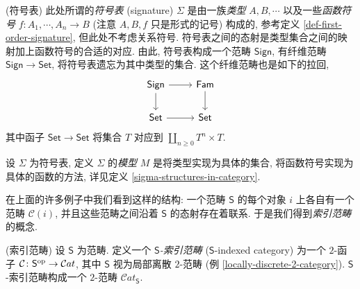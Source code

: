 \begin{example}
	{(符号表)}
	此处所谓的\emph{符号表} (signature) $\Sigma$ 是由一族\emph{类型} $A,B,\cdots$ 以及一些\emph{函数符号} $f\colon A_1,\cdots,A_n\to B$ (注意 $A,B,f$ 只是形式的记号) 构成的, 参考定义 \ref{def-first-order-signature}, 但此处不考虑关系符号. 符号表之间的态射是类型集合之间的映射加上函数符号的合适的对应. 由此, 符号表构成一个范畴 $\mathsf {Sign}$, 有纤维范畴 $\mathsf {Sign}\to\mathsf {Set}$, 将符号表遗忘为其中类型的集合.
	这个纤维范畴也是如下的拉回,
	\[\begin{tikzcd}[ampersand replacement=\&]
		{\mathsf {Sign}} \& {\mathsf {Fam}} \\
		{\mathsf {Set}} \& {\mathsf {Set}}
		\arrow[from=1-1, to=2-1]
		\arrow[from=2-1, to=2-2]
		\arrow[from=1-1, to=1-2]
		\arrow[from=1-2, to=2-2]
	\end{tikzcd}\]
	其中函子 $\mathsf {Set}\to\mathsf {Set}$ 将集合 $T$ 对应到 $\coprod_{n\geq 0}T^n\times T$.
	
	设 $\Sigma$ 为符号表, 定义 $\Sigma$ 的\emph{模型} $M$ 是将类型实现为具体的集合, 将函数符号实现为具体的函数的方法, 详见定义 \ref{sigma-structures-in-category}.
\end{example}

在上面的许多例子中我们看到这样的结构: 一个范畴 $\mathsf S$ 的每个对象 $i$ 上各自有一个范畴 $\mathcal C(i)$, 并且这些范畴之间沿着 $\mathsf S$ 的态射存在着联系. 于是我们得到\emph{索引范畴}的概念.

\begin{definition}
	{(索引范畴)}
	设 $\mathsf S$ 为范畴. 定义一个 \emph{$\mathsf S$-索引范畴} ($\mathsf {S}$-indexed category) 为一个 $2$-函子%
	$\mathcal C\colon \mathsf S^{\text{op}}\to\mathcal Cat$, 其中 $\mathsf S$ 视为局部离散 $2$-范畴 (例 \ref{locally-discrete-2-category}). $\mathsf S$-索引范畴构成一个 $2$-范畴 $\mathcal Cat_{\mathsf S}$.
\end{definition}

